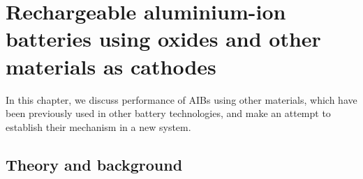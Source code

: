 
\chapter{Rechargeable aluminium-ion batteries using oxides and other materials as cathodes} %
In this chapter, we discuss performance of AIBs using other materials, which have been previously used in other battery technologies, and make an attempt to establish their mechanism in a new system.
\label{chap6} %


\newcommand{\keyword}[1]{\textbf{#1}}
\newcommand{\tabhead}[1]{\textbf{#1}}
\newcommand{\code}[1]{\texttt{#1}}
\newcommand{\file}[1]{\texttt{\bfseries#1}}
\newcommand{\option}[1]{\texttt{\itshape#1}}

\section{Theory and background}
